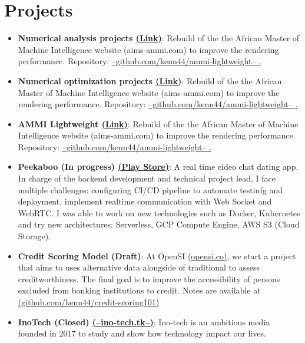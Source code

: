 \documentclass[letterpaper,11pt]{article}
\newcommand{\resumeItem}[2]{
  \item\small{
    \textbf{#1}{: #2 \vspace{-2pt}}
  }
}
\newcommand{\resumeSubItem}[2]{\resumeItem{#1}{#2}\vspace{-4pt}}
\newcommand{\resumeSubHeadingListStart}{\begin{itemize}[leftmargin=*]}
\newcommand{\resumeSubHeadingListEnd}{\end{itemize}}
\begin{document}
\section{Projects}
  \resumeSubHeadingListStart
  \resumeSubItem{Numerical analysis projects \href{https://suspicious-brown-5e9d1b.netlify.com/}{(Link)}}
      {Rebuild of the the African Master of Machine Intelligence website (aims-ammi.com) to improve the rendering performance. Repository: \href{https://github.com/kenn44/ammi-lightweight}{--github.com/kenn44/ammi-lightweight-- .}}
      \resumeSubItem{Numerical optimization projects \href{https://suspicious-brown-5e9d1b.netlify.com/}{(Link)}}
      {Rebuild of the the African Master of Machine Intelligence website (aims-ammi.com) to improve the rendering performance. Repository: \href{https://github.com/kenn44/ammi-lightweight}{--github.com/kenn44/ammi-lightweight-- .}}
    \resumeSubItem{AMMI Lightweight \href{https://suspicious-brown-5e9d1b.netlify.com/}{(Link)}}
      {Rebuild of the the African Master of Machine Intelligence website (aims-ammi.com) to improve the rendering performance. Repository: \href{https://github.com/kenn44/ammi-lightweight}{--github.com/kenn44/ammi-lightweight-- .}}
    \resumeSubItem{Peekaboo (In progress) \href{https://play.google.com/store/apps/details?id=mvp.peekaboo.dev}{(Play Store)}}
      {A real time cideo chat dating app. In charge of the backend development and technical project lead, I face multiple challenges: configuring CI/CD pipeline to automate testinfg and deployment, implement realtime communication with Web Socket and WebRTC. I was able to work on new technologies such as Docker, Kubernetes and try new architectures: Serverless, GCP Compute Engine, AWS S3 (Cloud Storage).}
    \resumeSubItem{Credit Scoring Model (Draft)}
      {At OpenSI \href{http://opensi.co/}{(opensi.co)}, we start a project that aims to uses alternative data alongside of traditional to assess creditworthiness. The final goal is to improve the accessibility of persons excluded from banking institutions to credit. Notes are available at \href{https://github.com/kenn44/credit-scoring101}{(github.com/kenn44/credit-scoring101)} }
    \resumeSubItem{InoTech (Closed) \href{https://ino-tech.tk/}{(--ino-tech.tk--)}}
      {Ino-tech is an ambitious media founded in 2017 to study and show how technology impact our lives.}
  \resumeSubHeadingListEnd

%


\end{document}
